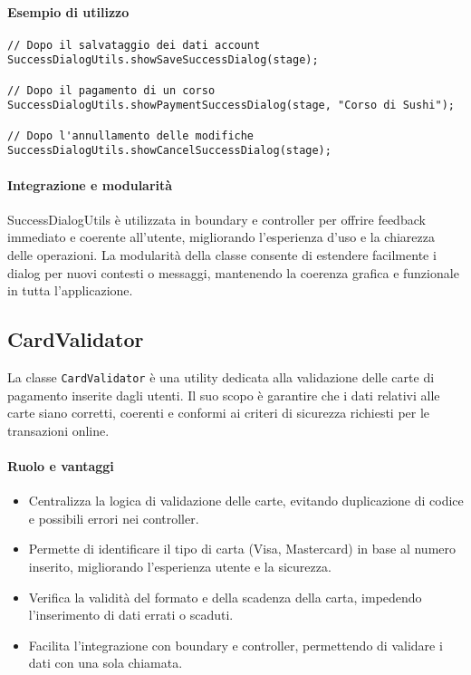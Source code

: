 \paragraph{Esempio di utilizzo}
\begin{verbatim}
// Dopo il salvataggio dei dati account
SuccessDialogUtils.showSaveSuccessDialog(stage);

// Dopo il pagamento di un corso
SuccessDialogUtils.showPaymentSuccessDialog(stage, "Corso di Sushi");

// Dopo l'annullamento delle modifiche
SuccessDialogUtils.showCancelSuccessDialog(stage);
\end{verbatim}

\paragraph{Integrazione e modularità}
SuccessDialogUtils è utilizzata in boundary e controller per offrire feedback immediato e coerente all'utente, migliorando l'esperienza d'uso e la chiarezza delle operazioni. La modularità della classe consente di estendere facilmente i dialog per nuovi contesti o messaggi, mantenendo la coerenza grafica e funzionale in tutta l'applicazione.

\subsection{CardValidator}
La classe \texttt{CardValidator} è una utility dedicata alla validazione delle carte di pagamento inserite dagli utenti. Il suo scopo è garantire che i dati relativi alle carte siano corretti, coerenti e conformi ai criteri di sicurezza richiesti per le transazioni online.

\paragraph{Ruolo e vantaggi}
\begin{itemize}
    \item Centralizza la logica di validazione delle carte, evitando duplicazione di codice e possibili errori nei controller.
    \item Permette di identificare il tipo di carta (Visa, Mastercard) in base al numero inserito, migliorando l'esperienza utente e la sicurezza.
    \item Verifica la validità del formato e della scadenza della carta, impedendo l'inserimento di dati errati o scaduti.
    \item Facilita l'integrazione con boundary e controller, permettendo di validare i dati con una sola chiamata.
\end{itemize}

